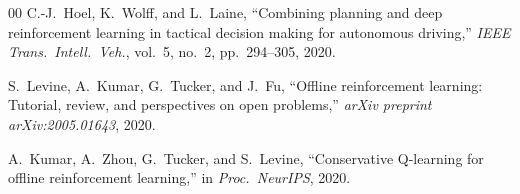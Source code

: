 \documentclass[conference]{IEEEtran}
\begin{document}
\begin{thebibliography}{00}
C.-J.\ Hoel, K.\ Wolff, and L.\ Laine,
``Combining planning and deep reinforcement learning in tactical decision making
for autonomous driving,''
\textit{IEEE Trans.\ Intell.\ Veh.}, vol.\ 5, no.\ 2, pp.\ 294--305, 2020.

S.\ Levine, A.\ Kumar, G.\ Tucker, and J.\ Fu,
``Offline reinforcement learning: Tutorial, review, and perspectives on open problems,''
\textit{arXiv preprint arXiv:2005.01643}, 2020.

A.\ Kumar, A.\ Zhou, G.\ Tucker, and S.\ Levine,
``Conservative Q-learning for offline reinforcement learning,''
in \textit{Proc.\ NeurIPS}, 2020.

\end{thebibliography}
\end{document}
